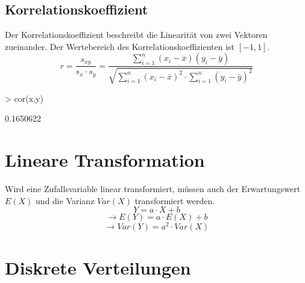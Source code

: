 \subsection{Korrelationskoeffizient}
Der Korrelationskoeffizient beschreibt die Linearität von zwei Vektoren 
zueinander. Der Wertebereich des Korrelationskoeffizienten ist $[-1, 1]$. 
\[ r = \frac{s_{xy}}{s_x \cdot s_y} 
= \frac{\sum\limits_{i=1}^{n} (x_i - \bar{x}) (y_i - \bar{y})}
{\sqrt{\sum\limits_{i=1}^{n} (x_i - \bar{x})^2  \cdot 
\sum\limits_{i=1}^{n} (y_i - \bar{y})^2 }} \]
\begin{Schunk}
\begin{Sinput}
> cor(x,y)
\end{Sinput}
\begin{Soutput}
[1] 0.1650622
\end{Soutput}
\end{Schunk}

\section{Lineare Transformation}
Wird eine Zufallsvariable linear transformiert, müssen auch der Erwartungswert 
$E(X)$ und die Varianz $Var(X)$ transformiert werden. 
\[ Y = a \cdot X + b \]
\[ \rightarrow E(Y) = a \cdot E(X) + b \]
\[ \rightarrow Var(Y) = a^2 \cdot Var(X) \]

\section{Diskrete Verteilungen}

